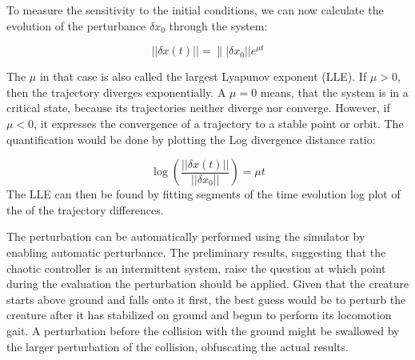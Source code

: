 \documentclass[main]{subfiles}
\begin{document}
To measure the sensitivity to the initial conditions, we can now calculate the evolution of the perturbance \(\delta x_0\) through the system:

\[||\delta x(t)|| = \||\delta x_0|| e^{\mu t}\]

The \(\mu\) in that case is also called the largest Lyapunov exponent (LLE).%
%
If \(\mu > 0\), then the trajectory diverges exponentially. %
%
A \(\mu = 0\) means, that the system is in a critical state, because its trajectories neither diverge nor converge. %
%
However, if \(\mu < 0\), it expresses the convergence of a trajectory to a stable point or orbit. %
%
The quantification would be done by plotting the Log divergence distance ratio:

\[\log\left(\frac{||\delta x(t)||}{||\delta x_0||}\right) = \mu t\]
%
The LLE can then be found by fitting segments of the time evolution log plot of the of the trajectory differences. 

The perturbation can be automatically performed using the simulator by enabling automatic perturbance. %
%
The preliminary results, suggesting that the chaotic controller is an intermittent system, raise the question at which point during the evaluation the perturbation should be applied. %
%
Given that the creature starts above ground and falls onto it first, the best guess would be to perturb the creature after it has stabilized on ground and begun to perform its locomotion gait. %
%
A perturbation before the collision with the ground might be swallowed by the larger perturbation of the collision, obfuscating the actual results. %
\end{document}
